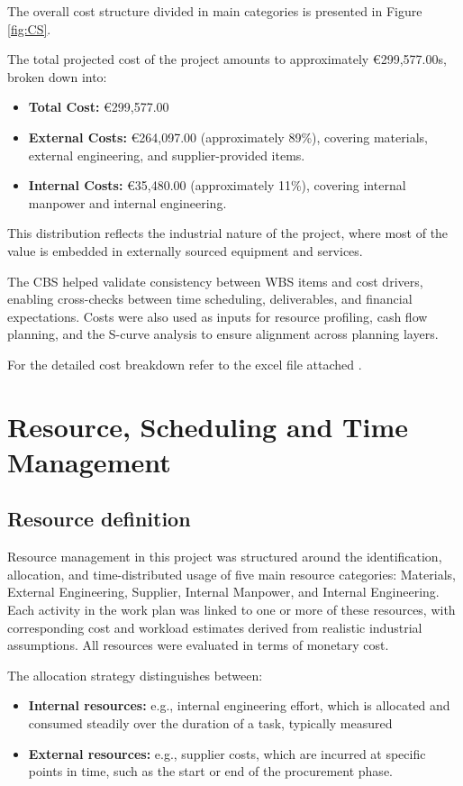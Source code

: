 The overall cost structure divided in main categories is presented in Figure \ref{fig:CS}.

The total projected cost of the project amounts to approximately €299,577.00s, broken down into:
\begin{itemize}
    \item \textbf{Total Cost:} €299,577.00
    \item \textbf{External Costs:} €264,097.00 (approximately 89\%), covering materials, external engineering, and supplier-provided items.
    \item \textbf{Internal Costs:} €35,480.00 (approximately 11\%), covering internal manpower and internal engineering.
\end{itemize}

This distribution reflects the industrial nature of the project, where most of the value is embedded in externally sourced equipment and services.

The CBS helped validate consistency between WBS items and cost drivers, enabling cross-checks between time scheduling, deliverables, and financial expectations. Costs were also used as inputs for resource profiling, cash flow planning, and the S-curve analysis to ensure alignment across planning layers.

For the detailed cost breakdown refer to the excel file attached \cite{CostEstimation}.

\section{Resource, Scheduling and Time Management}
\subsection{Resource definition}
Resource management in this project was structured around the identification, allocation, and time-distributed usage of five main resource categories: Materials, External Engineering, Supplier, Internal Manpower, and Internal Engineering. Each activity in the work plan was linked to one or more of these resources, with corresponding cost and workload estimates derived from realistic industrial assumptions. All resources were evaluated in terms of monetary cost.

The allocation strategy distinguishes between:
\begin{itemize}
    \item \textbf{Internal resources:} e.g., internal engineering effort, which is allocated and consumed steadily over the duration of a task, typically measured
    \item \textbf{External resources:} e.g., supplier costs, which are incurred at specific points in time, such as the start or end of the procurement phase.
\end{itemize}


